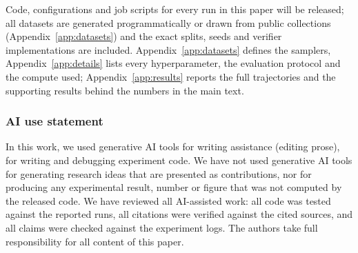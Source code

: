 Code, configurations and job scripts for every run in this paper will be released; all datasets are generated programmatically or drawn from public collections (Appendix~\ref{app:datasets}) and the exact splits, seeds and verifier implementations are included. Appendix~\ref{app:datasets} defines the samplers, Appendix~\ref{app:details} lists every hyperparameter, the evaluation protocol and the compute used; Appendix~\ref{app:results} reports the full trajectories and the supporting results behind the numbers in the main text.

\subsubsection*{AI use statement}
In this work, we used generative AI tools for writing assistance (editing prose), for writing and debugging experiment code. We have not used generative AI tools for generating research ideas that are presented as contributions, nor for producing any experimental result, number or figure that was not computed by the released code. We have reviewed all AI-assisted work: all code was tested against the reported runs, all citations were verified against the cited sources, and all claims were checked against the experiment logs. The authors take full responsibility for all content of this paper.
